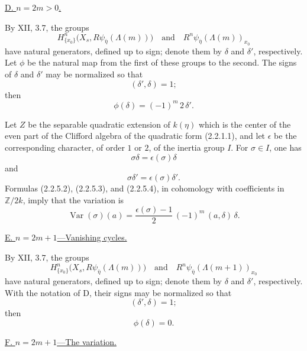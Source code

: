 \medskip
\noindent\underline{D. $n=2m>0$.}

By XII, 3.7, the groups
\[
H^n_{\{x_0\}}\bigl(X_s,R\psi_{\bar\eta}(\Lambda(m))\bigr)
\quad\text{and}\quad
R^n\psi_{\bar\eta}(\Lambda(m))_{x_0}
\]
have natural generators, defined up to sign; denote them by
$\delta$ and $\delta'$, respectively.  Let $\phi$ be the natural map
from the first of these groups to the second.  The signs of $\delta$
and $\delta'$ may be normalized so that
\begin{equation}\tag{2.2.5.2}
(\delta',\delta)=1;
\end{equation}
then
\begin{equation}\tag{2.2.5.3}
\phi(\delta)=(-1)^m\,2\,\delta'.
\end{equation}

Let $Z$ be the separable quadratic extension of $k(\eta)$ which is
the center of the even part of the Clifford algebra of the quadratic
form (2.2.1.1), and let $\epsilon$ be the corresponding character,
of order $1$ or $2$, of the inertia group $I$.  For $\sigma\in I$,
one has
\begin{equation}\tag{2.2.5.4}
\sigma\delta=\epsilon(\sigma)\delta
\end{equation}
and
\begin{equation}\tag{2.2.5.5}
\sigma\delta'=\epsilon(\sigma)\delta'.
\end{equation}
Formulas (2.2.5.2), (2.2.5.3), and (2.2.5.4), in cohomology with
coefficients in $\mathbb Z/2k$, imply that the variation is
\begin{equation}\tag{2.2.5.6}
\operatorname{Var}(\sigma)(a)=
\frac{\epsilon(\sigma)-1}{2}\,(-1)^m\,(a,\delta)\,\delta.
\end{equation}

\medskip
\noindent\underline{E. $n=2m+1$---Vanishing cycles.}

By XII, 3.7, the groups
\[
H^n_{\{x_0\}}\bigl(X_s,R\psi_{\bar\eta}(\Lambda(m))\bigr)
\quad\text{and}\quad
R^n\psi_{\bar\eta}(\Lambda(m+1))_{x_0}
\]
have natural generators, defined up to sign; denote them by
$\delta$ and $\delta'$, respectively.  With the notation of D, their
signs may be normalized so that
\begin{equation}\tag{2.2.5.7}
(\delta',\delta)=1;
\end{equation}
then
\begin{equation}\tag{2.2.5.8}
\phi(\delta)=0.
\end{equation}

\medskip
\noindent\underline{F. $n=2m+1$---The variation.}

